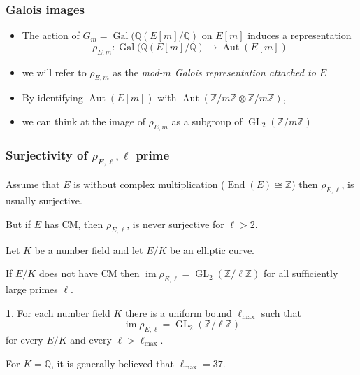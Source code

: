 \documentclass[10pt,final]{beamer} %
\newcommand{\Q}{\mathbb Q}
\newcommand{\Z}{\mathbb Z}
\theoremstyle{definition}
\newtheorem{conj}[theorem]{\translate{Conjecture}}
\begin{document}
\begin{frame}
\frametitle{Galois images}

\begin{itemize}[<+-| alert@+>]
 \item The action of $G_m=\operatorname{Gal}(\Q(E[m]/\Q)$ on $E[m]$ induces a representation
$$\rho_{E,m}: \operatorname{Gal}(\Q(E[m]/\Q) \longrightarrow \operatorname{Aut}(E[m])$$
\item[] we will refer to $\rho_{E,m}$ as the \emph{mod-$m$ Galois representation attached to $E$}
\item By identifying $\operatorname{Aut}(E[m])$  with $\operatorname{Aut}(\Z/m\Z \otimes \Z/m\Z)$,
\item[] we can think at the image of $\rho_{E,m}$ as a subgroup of $\operatorname{GL}_2(\Z/m\Z)$
\end{itemize}
\end{frame}

\begin{frame}
\frametitle{Surjectivity of $\rho_{E,\ell}, \ell$ prime}
Assume that $E$ is without complex multiplication ($\operatorname{End}(E)\cong \Z$)
then $\rho_{E,\ell}$, is usually surjective.\pause

But if $E$ has CM, then $\rho_{E,\ell}$, is never surjective for $\ell> 2$.\pause
 
Let $K$  be a number field and let $E/K$ be an elliptic curve.\pause
 
\begin{theorem}[Serre]
If $E/K$ does not have CM then $\operatorname{im}\rho_{E,\ell}=\operatorname{GL}_2 (\Z/\ell \Z)$ for all
sufficiently large primes $\ell$.
\end{theorem}\pause
 
 \begin{conj}
 For each number field $K$ there is a uniform bound $\ell_{\text{max}}$ such that
 $$\operatorname{im}\rho_{E,\ell}=\operatorname{GL}_2 (\Z/\ell \Z)$$ 
 for every $E/K$ and every $\ell>\ell_{\text{max}}$.
 \end{conj}\pause 

For $K = \Q$, it is generally believed that $\ell_{\text{max}}= 37$. 

\end{frame}
\end{document}

